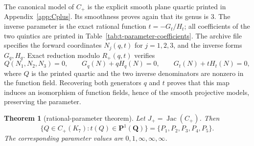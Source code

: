 \documentclass[11pt]{article}
\newcommand{\Q}{\mathbf Q}
\newcommand{\Pone}{\mathbf P^1}
\newtheorem{theorem}{Theorem}[section]
\theoremstyle{definition}
\theoremstyle{remark}
\begin{document}
The canonical model of $C_+$ is the explicit smooth plane quartic printed
in Appendix~\ref{app:Cplus}.  Its smoothness proves again that its genus is
$3$.  The inverse parameter is the exact rational function
$t=-G_t/H_t$; all coefficients of the two quintics are printed in
Table~\ref{tab:t-parameter-coefficients}.
The archive file  specifies
the forward coordinates $N_j(q,t)$ for $j=1,2,3$, and the inverse
forms $G_q,H_q$.  Exact reduction modulo $R_+(q,t)$ verifies
\[
 Q(N_1,N_2,N_3)=0,\qquad
 G_q(N)+qH_q(N)=0,\qquad G_t(N)+tH_t(N)=0,
\]
where $Q$ is the printed quartic and the two inverse denominators are
nonzero in the function field.  Recovering both generators $q$ and $t$
proves that this map induces an isomorphism of function fields, hence of
the smooth projective models, preserving the parameter.

\begin{theorem}[rational-parameter theorem]\label{thm:rational-t}
Let $J_+=\operatorname{Jac}(C_+)$.  Then
\[
 \{Q\in C_+(K_7):t(Q)\in\Pone(\Q)\}
       =\{P_1,P_2,P_3,P_4,P_5\}.
\]
The corresponding parameter values are $0,1,\infty,\infty,\infty$.
\end{theorem}
\end{document}
